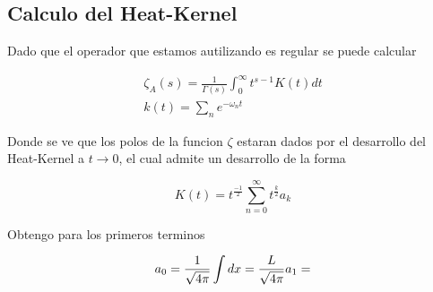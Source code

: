 \subsection{Calculo del Heat-Kernel}

Dado que el operador que estamos autilizando es regular se puede calcular 

\begin{equation}
\begin{array}{c}
\zeta _A (s) = 
\frac{1}{\Gamma (s)} 
\int _0 ^{\infty}
t ^{s-1}
K(t)
dt \\
k(t) = \sum _{n} e^{- \omega _n t}
\end{array}
\end{equation}

Donde se ve que los polos de la funcion $\zeta$ estaran dados por el desarrollo del Heat-Kernel a $t \rightarrow 0 $, el cual admite un desarrollo de la forma

\begin{equation}
K (t) = 
t ^{\frac{-1}{2}}
\sum _{n=0} ^{\infty}
t ^{\frac{k}{2}}
a _k
\end{equation}

Obtengo para los primeros terminos

\begin{equation}
a _0 = 
\frac{1}{\sqrt{4 \pi}}
\int dx =
\frac{L}{\sqrt{4 \pi}} \\
a_1 = 
\end{equation}














